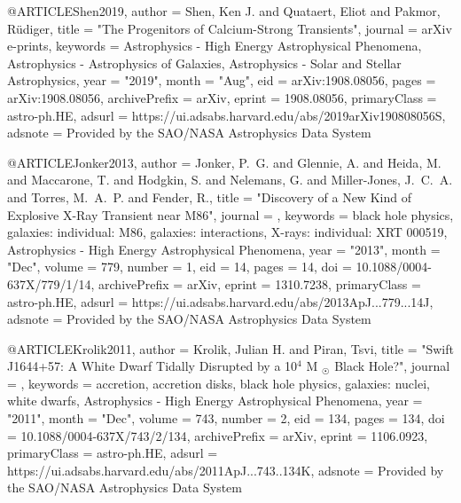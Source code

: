\documentclass[twocolumn,tighten]{aastex63}
\begin{document}
@ARTICLE{Shen2019,
       author = {{Shen}, Ken J. and {Quataert}, Eliot and {Pakmor}, R{\"u}diger},
        title = "{The Progenitors of Calcium-Strong Transients}",
      journal = {arXiv e-prints},
     keywords = {Astrophysics - High Energy Astrophysical Phenomena, Astrophysics - Astrophysics of Galaxies, Astrophysics - Solar and Stellar Astrophysics},
         year = "2019",
        month = "Aug",
          eid = {arXiv:1908.08056},
        pages = {arXiv:1908.08056},
archivePrefix = {arXiv},
       eprint = {1908.08056},
 primaryClass = {astro-ph.HE},
       adsurl = {https://ui.adsabs.harvard.edu/abs/2019arXiv190808056S},
      adsnote = {Provided by the SAO/NASA Astrophysics Data System}
}

@ARTICLE{Jonker2013,
       author = {{Jonker}, P.~G. and {Glennie}, A. and {Heida}, M. and {Maccarone}, T. and
         {Hodgkin}, S. and {Nelemans}, G. and {Miller-Jones}, J.~C.~A. and
         {Torres}, M.~A.~P. and {Fender}, R.},
        title = "{Discovery of a New Kind of Explosive X-Ray Transient near M86}",
      journal = {\apj},
     keywords = {black hole physics, galaxies: individual: M86, galaxies: interactions, X-rays: individual: XRT 000519, Astrophysics - High Energy Astrophysical Phenomena},
         year = "2013",
        month = "Dec",
       volume = {779},
       number = {1},
          eid = {14},
        pages = {14},
          doi = {10.1088/0004-637X/779/1/14},
archivePrefix = {arXiv},
       eprint = {1310.7238},
 primaryClass = {astro-ph.HE},
       adsurl = {https://ui.adsabs.harvard.edu/abs/2013ApJ...779...14J},
      adsnote = {Provided by the SAO/NASA Astrophysics Data System}
}

@ARTICLE{Krolik2011,
       author = {{Krolik}, Julian H. and {Piran}, Tsvi},
        title = "{Swift J1644+57: A White Dwarf Tidally Disrupted by a {}10$^{4}$ M $_{☉}$ Black Hole?}",
      journal = {\apj},
     keywords = {accretion, accretion disks, black hole physics, galaxies: nuclei, white dwarfs, Astrophysics - High Energy Astrophysical Phenomena},
         year = "2011",
        month = "Dec",
       volume = {743},
       number = {2},
          eid = {134},
        pages = {134},
          doi = {10.1088/0004-637X/743/2/134},
archivePrefix = {arXiv},
       eprint = {1106.0923},
 primaryClass = {astro-ph.HE},
       adsurl = {https://ui.adsabs.harvard.edu/abs/2011ApJ...743..134K},
      adsnote = {Provided by the SAO/NASA Astrophysics Data System}
}
\end{document}

